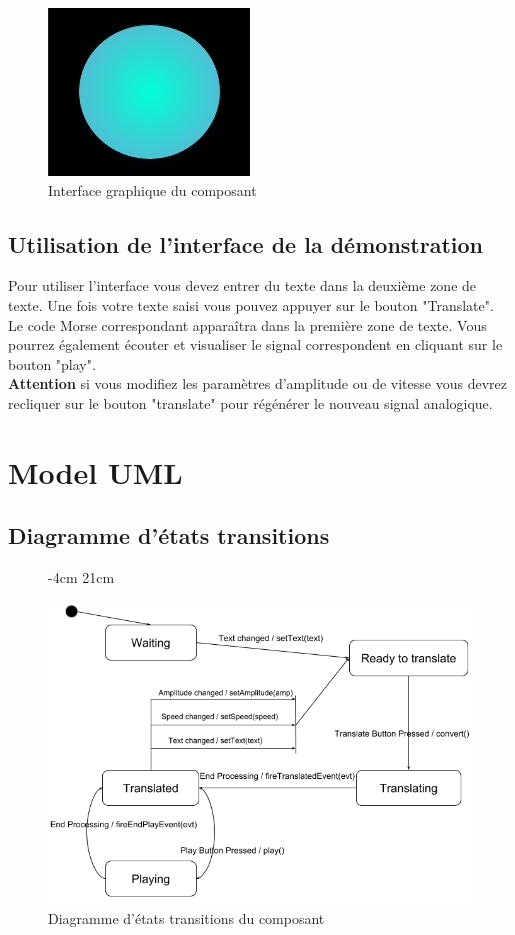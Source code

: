 \documentclass[a4paper,11pt]{article}
\begin{document}
	\begin{figure}[H]
		\begin{center}
			\includegraphics[scale=0.5]{comdescpicture.jpg}
			\caption{Interface graphique du composant}
			\label{Interface graphique du composant}
		\end{center}
	\end{figure}
    \subsection{Utilisation de l'interface de la démonstration}
    Pour utiliser l'interface vous devez entrer du texte dans la deuxième zone de texte. Une fois votre texte saisi vous pouvez appuyer sur le bouton "Translate". Le code Morse correspondant apparaîtra dans la première zone de texte. Vous pourrez également écouter et visualiser le signal correspondent en cliquant sur le bouton "play".\\
    \textbf{Attention} si vous modifiez les paramètres d'amplitude ou de vitesse vous devrez recliquer sur le bouton "translate" pour régénérer le nouveau signal analogique.
    

    \section{Model UML}
    \subsection{Diagramme d'états transitions}
     \begin{figure}[H]
    	 -4cm 21cm
    	\begin{center}
    		\includegraphics[scale=0.8]{etatsdiag.png}
    		\caption{Diagramme d'états transitions du composant}
    		\label{Diagramme d'états transitions du composant}
    	\end{center}
    \end{figure}
\end{document}
